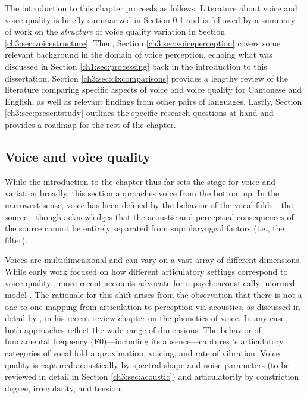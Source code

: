 The introduction to this chapter proceeds as follows. Literature about voice and voice quality is briefly summarized in Section \ref{ch3:sec:voicequality} and is followed by a summary of work on the \textit{structure} of voice quality variation in Section \ref{ch3:sec:voicestructure}. Then, Section \ref{ch3:sec:voiceperception} covers some relevant background in the domain of voice perception, echoing what was discussed in Section \ref{ch1:sec:processing} back in the introduction to this dissertation. Section \ref{ch3:sec:clxcomparisons} provides a lengthy review of the literature comparing specific aspects of voice and voice quality for Cantonese and English, as well as relevant findings from other pairs of languages. Lastly, Section \ref{ch3:sec:presentstudy} outlines the specific research questions at hand and provides a roadmap for the rest of the chapter. 

\subsection{Voice and voice quality}\label{ch3:sec:voicequality}

While the introduction to the chapter thus far sets the stage for voice and variation broadly, this section approaches voice from the bottom up. In the narrowest sense, voice has been defined by the behavior of the vocal folds---the source---though \citet{garellek_2019_voice} acknowledges that the acoustic and perceptual consequences of the source cannot be entirely separated from supralaryngeal factors (i.e., the filter). 

Voices are multidimensional and can vary on a vast array of different dimensions. While early work focused on how different articulatory settings correspond to voice quality \citep{laver_1980_phonetic, pittam_1987_lts}, more recent accounts advocate for a psychoacoustically informed model \citep{kreiman_2014_theory}. The rationale for this shift arises from the observation that there is not a one-to-one mapping from articulation to perception via acoustics, as discussed in detail by \citet{garellek_2019_voice}, in his recent review chapter on the phonetics of voice. In any case, both approaches reflect the wide range of dimensions. The behavior of fundamental frequency (F0)---including its absence---captures \citeauthor{garellek_2019_voice}'s \citeyearpar{garellek_2019_voice} articulatory categories of vocal fold approximation, voicing, and rate of vibration. Voice quality is captured acoustically by spectral shape and noise parameters (to be reviewed in detail in Section \ref{ch3:sec:acoustic}) and articulatorily by constriction degree, irregularity, and tension. 

